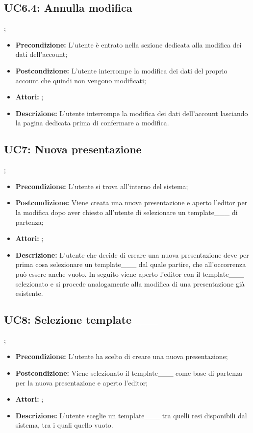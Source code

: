 \subsection{ UC6.4: Annulla modifica}
;
\begin{itemize}
	\item \textbf{Precondizione:} L’utente è entrato nella sezione dedicata alla modifica dei dati dell’account;
	\item \textbf{Postcondizione:} L’utente interrompe la modifica dei dati del proprio account che quindi non vengono modificati;
	\item \textbf{Attori:} ;
	\item \textbf{Descrizione:} L’utente interrompe la modifica dei dati dell’account lasciando la pagina dedicata prima di confermare a modifica.
\end{itemize}
\subsection{ UC7: Nuova presentazione}
;
\begin{itemize}
	\item \textbf{Precondizione:} L’utente si trova all’interno del sistema;
	\item \textbf{Postcondizione:} Viene creata una nuova presentazione e aperto l’editor per la modifica dopo aver chiesto all’utente di selezionare un template___ di partenza;
	\item \textbf{Attori:} ;
	\item \textbf{Descrizione:} L’utente che decide di creare una nuova presentazione deve per prima cosa selezionare un template___ dal quale partire, che all’occorrenza può essere anche vuoto. In seguito viene aperto l’editor con il template___ selezionato e si procede analogamente alla modifica di una presentazione già esistente.
\end{itemize}
\subsection{ UC8: Selezione template___}
;
\begin{itemize}
	\item \textbf{Precondizione:} L’utente ha scelto di creare una nuova presentazione;
	\item \textbf{Postcondizione:} Viene selezionato il template___ come base di partenza per la nuova presentazione e aperto l’editor;
	\item \textbf{Attori:} ;
	\item \textbf{Descrizione:} L’utente sceglie un template___ tra quelli resi disponibili dal sistema, tra i quali quello vuoto.
\end{itemize}

